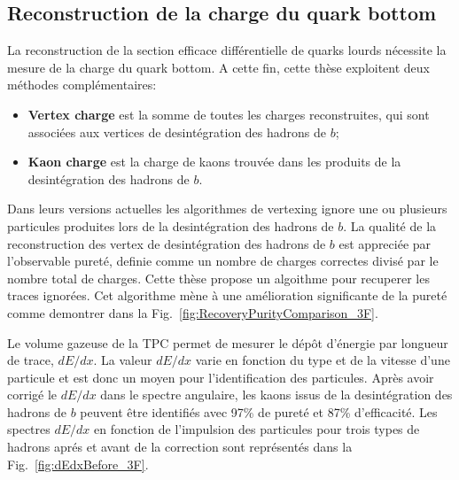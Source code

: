 \subsection*{Reconstruction de la charge du quark bottom}
La reconstruction de la section efficace différentielle de quarks lourds nécessite la mesure de la charge du quark bottom.
A cette fin, cette thèse exploitent deux méthodes complémentaires:
\begin{itemize}
	\item \textbf{Vertex charge} est la somme de toutes les charges reconstruites, qui sont associées aux vertices de desintégration des hadrons de $b$;
	\item \textbf{Kaon charge} est la charge de kaons trouvée dans les produits de la desintégration des hadrons de $b$. 
\end{itemize}

Dans leurs versions actuelles les algorithmes de vertexing ignore une ou plusieurs particules produites lors de la desintégration des hadrons de $b$. La qualité de la reconstruction des vertex de desintégration des hadrons de $b$ est appreciée par l'observable pureté, definie comme un nombre de charges correctes divis\'e par le nombre total de charges.
Cette thèse propose un algoithme pour recuperer les traces ignorées. Cet algorithme mène à une amélioration significante de la pureté comme demontrer dans la Fig.~\ref{fig:RecoveryPurityComparison_3F}.%

Le volume gazeuse de la TPC permet de mesurer le dépôt d'énergie par longueur de trace, $dE/dx$. La valeur  $dE/dx$ varie en fonction du type et de la vitesse d'une particule et est donc un moyen pour l'identification des particules.  Après avoir corrigé le $dE/dx$ dans le spectre angulaire, les kaons issus de la desintégration des hadrons de $b$ peuvent être identifiés avec 97\% de pureté et 87\% d'efficacité.
Les spectres $dE/dx$ en fonction de l'impulsion des particules pour trois types de hadrons apr\'es et avant de la correction sont représentés dans la Fig.~\ref{fig:dEdxBefore_3F}.

